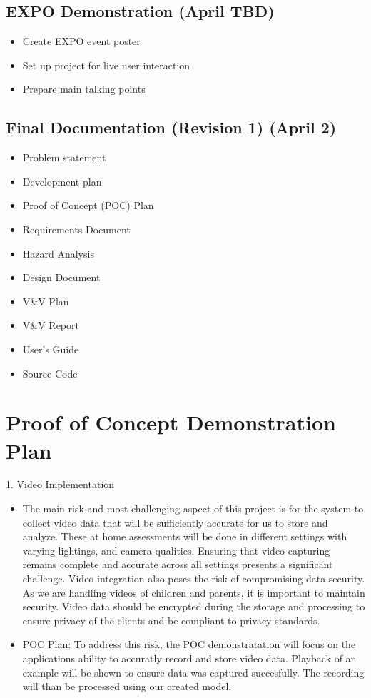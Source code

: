 \documentclass{article}
\begin{document}
	\subsection{EXPO Demonstration (April TBD)}
	\begin{itemize}
		\item Create EXPO event poster
		\item Set up project for live user interaction
		\item Prepare main talking points
	\end{itemize}

	\subsection{Final Documentation (Revision 1) (April 2)}
	\begin{itemize}
		\item Problem statement
		\item Development plan
		\item Proof of Concept (POC) Plan
		\item Requirements Document
		\item Hazard Analysis
		\item Design Document
		\item V\&V Plan
		\item V\&V Report
		\item User’s Guide
		\item Source Code
	\end{itemize}

\section{Proof of Concept Demonstration Plan}

1. Video Implementation 
\begin{itemize}
  \item The main risk and most challenging aspect of this project is for the system to collect video data that will be sufficiently accurate for us to store and analyze. 
  These at home assessments will be done in different settings with varying lightings, and camera qualities. Ensuring that video capturing remains complete and accurate across all settings presents a significant challenge.  Video integration also poses the risk of compromising data security. As we are handling videos of children and parents, it is important to maintain security. Video data should be encrypted during the storage and processing to ensure privacy of the clients and be compliant to privacy standards. \\  
  \item POC Plan: To address this risk, the POC demonstratation will focus on the applications ability to accuratly record and store video data. Playback of an example will be shown to ensure data was captured succesfully. The recording will than be processed using our created model. 
\end{itemize} 
\end{document}
